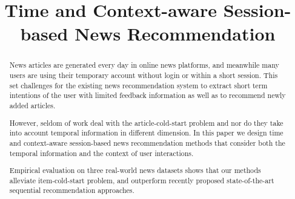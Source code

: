\documentclass[letterpaper]{article}
\begin{document}
%
\title{Time and Context-aware Session-based News Recommendation}
\maketitle
\begin{abstract}
    News articles are generated every day in online news platforms, and meanwhile many users are using their temporary account without login or within a short session. This set challenges for the existing news recommendation system to extract short term intentions of the user with limited feedback information as well as to recommend newly added articles. 
    
    
    However, seldom of work deal with the article-cold-start problem and nor do they take into account temporal information in different dimension. In this paper we design time and context-aware session-based news recommendation methods that consider both the temporal information and the context of user interactions. 
    
    
    Empirical evaluation on three real-world news datasets shows that our methods alleviate item-cold-start problem, and outperform recently proposed state-of-the-art sequential recommendation approaches.
\end{abstract}










\end{document}
